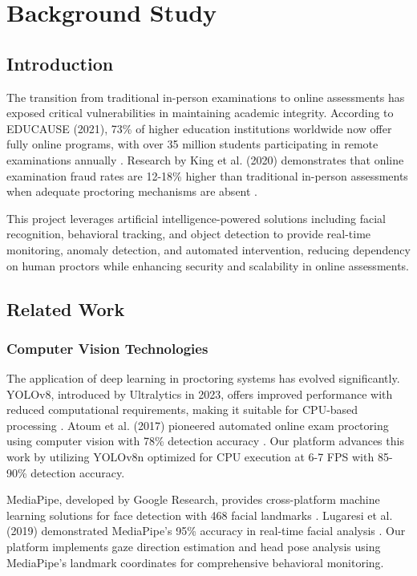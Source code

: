 \chapter{Background Study}
\label{chap:2}

\section{Introduction}

The transition from traditional in-person examinations to online assessments has exposed critical vulnerabilities in maintaining academic integrity. According to EDUCAUSE (2021), 73\% of higher education institutions worldwide now offer fully online programs, with over 35 million students participating in remote examinations annually \cite{educause2021}. Research by King et al. (2020) demonstrates that online examination fraud rates are 12-18\% higher than traditional in-person assessments when adequate proctoring mechanisms are absent \cite{king2020}.

This project leverages artificial intelligence-powered solutions including facial recognition, behavioral tracking, and object detection to provide real-time monitoring, anomaly detection, and automated intervention, reducing dependency on human proctors while enhancing security and scalability in online assessments.

\section{Related Work}

\subsection{Computer Vision Technologies}

The application of deep learning in proctoring systems has evolved significantly. YOLOv8, introduced by Ultralytics in 2023, offers improved performance with reduced computational requirements, making it suitable for CPU-based processing \cite{ultralytics2023}. Atoum et al. (2017) pioneered automated online exam proctoring using computer vision with 78\% detection accuracy \cite{atoum2017}. Our platform advances this work by utilizing YOLOv8n optimized for CPU execution at 6-7 FPS with 85-90\% detection accuracy.

MediaPipe, developed by Google Research, provides cross-platform machine learning solutions for face detection with 468 facial landmarks \cite{google2023}. Lugaresi et al. (2019) demonstrated MediaPipe's 95\% accuracy in real-time facial analysis \cite{lugaresi2019}. Our platform implements gaze direction estimation and head pose analysis using MediaPipe's landmark coordinates for comprehensive behavioral monitoring.

